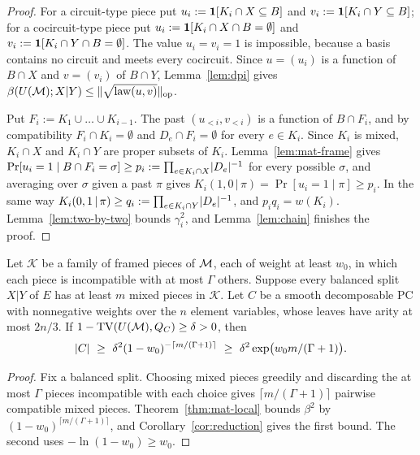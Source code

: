 \begin{proof}
For a circuit-type piece put $u_i:=\mathbf{1}[K_i\cap X\subseteq B]$ and $v_i:=\mathbf{1}[K_i\cap Y\subseteq B]$; for a cocircuit-type piece put $u_i:=\mathbf{1}[K_i\cap X\cap B=\emptyset]$ and $v_i:=\mathbf{1}[K_i\cap Y\cap B=\emptyset]$. The value $u_i=v_i=1$ is impossible, because a basis contains no circuit and meets every cocircuit. Since $u=(u_i)$ is a function of $B\cap X$ and $v=(v_i)$ of $B\cap Y$, Lemma~\ref{lem:dpi} gives $\beta(U(\mathcal{M});X|Y)\le\lVert \sqrt{\mathrm{law}(u,v)}\rVert_{\mathrm{op}}$.

Put $F_i:=K_1\cup\dots\cup K_{i-1}$. The past $(u_{<i},v_{<i})$ is a function of $B\cap F_i$, and by compatibility $F_i\cap K_i=\emptyset$ and $D_e\cap F_i=\emptyset$ for every $e\in K_i$. Since $K_i$ is mixed, $K_i\cap X$ and $K_i\cap Y$ are proper subsets of $K_i$. Lemma~\ref{lem:mat-frame} gives $\Pr[u_i=1\mid B\cap F_i=\sigma]\ge p_i:=\prod_{e\in K_i\cap X}\lvert D_e\rvert^{-1}$ for every possible $\sigma$, and averaging over $\sigma$ given a past $\pi$ gives $K_i(1,0\,|\,\pi)=\Pr[u_i=1\mid\pi]\ge p_i$. In the same way $K_i(0,1\,|\,\pi)\ge q_i:=\prod_{e\in K_i\cap Y}\lvert D_e\rvert^{-1}$, and $p_iq_i=w(K_i)$. Lemma~\ref{lem:two-by-two} bounds $\gamma_i^2$, and Lemma~\ref{lem:chain} finishes the proof.
\end{proof}

\begin{theorem}\label{thm:mat-pc}
Let $\mathcal K$ be a family of framed pieces of $\mathcal{M}$, each of weight at least $w_0$, in which each piece is incompatible with at most $\Gamma$ others. Suppose every balanced split $X|Y$ of $E$ has at least $m$ mixed pieces in $\mathcal K$. Let $C$ be a smooth decomposable PC with nonnegative weights over the $n$ element variables, whose leaves have arity at most $2n/3$. If $1-\mathrm{TV}(U(\mathcal{M}),Q_C)\ge\delta>0$, then
\[
  \abs C\ \ge\ \delta^2(1-w_0)^{-\lceil m/(\Gamma+1)\rceil}\ \ge\ \delta^2\exp\bigl(w_0m/(\Gamma+1)\bigr).
\]
\end{theorem}

\begin{proof}
Fix a balanced split. Choosing mixed pieces greedily and discarding the at most $\Gamma$ pieces incompatible with each choice gives $\lceil m/(\Gamma+1)\rceil$ pairwise compatible mixed pieces. Theorem~\ref{thm:mat-local} bounds $\beta^2$ by $(1-w_0)^{\lceil m/(\Gamma+1)\rceil}$, and Corollary~\ref{cor:reduction} gives the first bound. The second uses $-\ln(1-w_0)\ge w_0$.
\end{proof}


